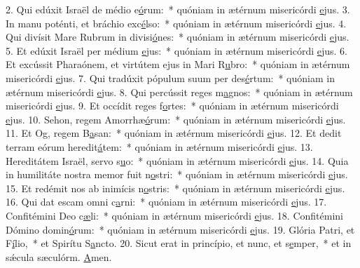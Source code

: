 2. Qui edúxit Israël de médio e\uline{ó}rum:~* quóniam in ætérnum misericórdi \uline{e}jus.
3. In manu poténti, et bráchio exc\uline{é}lso:~* quóniam in ætérnum misericórdi \uline{e}jus.
4. Qui divísit Mare Rubrum in divisi\uline{ó}nes:~* quóniam in ætérnum misericórdi \uline{e}jus.
5. Et edúxit Israël per médium \uline{e}jus:~* quóniam in ætérnum misericórdi \uline{e}jus.
6. Et excússit Pharaónem, et virtútem ejus in Mari R\uline{u}bro:~* quóniam in ætérnum misericórdi \uline{e}jus.
7. Qui tradúxit pópulum suum per des\uline{é}rtum:~* quóniam in ætérnum misericórdi \uline{e}jus.
8. Qui percússit reges m\uline{a}gnos:~* quóniam in ætérnum misericórdi \uline{e}jus.
9. Et occídit reges f\uline{o}rtes:~* quóniam in ætérnum misericórdi \uline{e}jus.
10. Sehon, regem Amorrhæ\uline{ó}rum:~* quóniam in ætérnum misericórdi \uline{e}jus.
11. Et Og, regem B\uline{a}san:~* quóniam in ætérnum misericórdi \uline{e}jus.
12. Et dedit terram eórum heredit\uline{á}tem:~* quóniam in ætérnum misericórdi \uline{e}jus.
13. Hereditátem Israël, servo s\uline{u}o:~* quóniam in ætérnum misericórdi \uline{e}jus.
14. Quia in humilitáte nostra memor fuit n\uline{o}stri:~* quóniam in ætérnum misericórdi \uline{e}jus.
15. Et redémit nos ab inimícis n\uline{o}stris:~* quóniam in ætérnum misericórdi \uline{e}jus.
16. Qui dat escam omni c\uline{a}rni:~* quóniam in ætérnum misericórdi \uline{e}jus.
17. Confitémini Deo c\uline{æ}li:~* quóniam in ætérnum misericórdi \uline{e}jus.
18. Confitémini Dómino domin\uline{ó}rum:~* quóniam in ætérnum misericórdi \uline{e}jus.
19. Glória Patri, et F\uline{í}lio,~* et Spirítu S\uline{a}ncto.
20. Sicut erat in princípio, et nunc, et s\uline{e}mper,~* et in sǽcula sæculórm. \uline{A}men.
